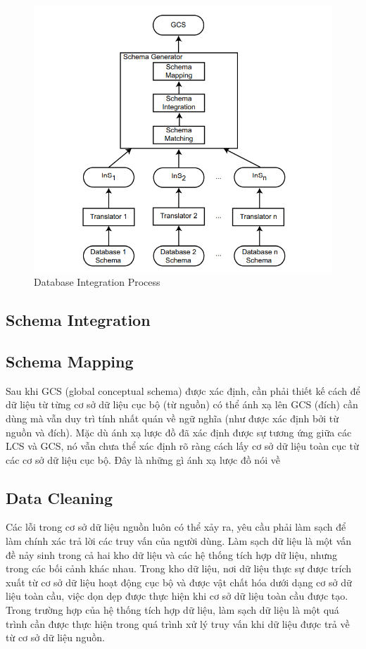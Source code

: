 \documentclass[a4paper]{article}
\begin{document}
\begin{figure}
    \centering
    \includegraphics[]{image/chap4/DBIntegrationProc.PNG}
    \caption{Database Integration Process}
\end{figure}



\subsection{Schema Integration}
\subsection{Schema Mapping}
Sau khi GCS (global conceptual schema) được xác định, cần phải thiết kế cách để dữ liệu từ từng cơ sở dữ liệu cục bộ (từ nguồn) có thể ánh xạ lên GCS (đích) cần dùng mà vẫn duy trì tính nhất quán về ngữ nghĩa (như được xác định bởi từ nguồn và đích). Mặc dù ánh xạ lược đồ đã xác định được sự tương ứng giữa các LCS và GCS, nó vẫn chưa thể xác định rõ ràng cách lấy cơ sở dữ liệu toàn cục từ các cơ sở dữ liệu cục bộ. Đây là những gì ánh xạ lược đồ nói về

\subsection{Data Cleaning}
Các lỗi trong cơ sở dữ liệu nguồn luôn có thể xảy ra, yêu cầu phải làm sạch để làm chính xác
trả lời các truy vấn của người dùng. Làm sạch dữ liệu là một vấn đề nảy sinh trong cả hai kho dữ liệu
và các hệ thống tích hợp dữ liệu, nhưng trong các bối cảnh khác nhau. Trong kho dữ liệu, nơi
dữ liệu thực sự được trích xuất từ cơ sở dữ liệu hoạt động cục bộ và được vật chất hóa dưới dạng
cơ sở dữ liệu toàn cầu, việc dọn dẹp được thực hiện khi cơ sở dữ liệu toàn cầu được tạo. Trong trường hợp
của hệ thống tích hợp dữ liệu, làm sạch dữ liệu là một quá trình cần được thực hiện
trong quá trình xử lý truy vấn khi dữ liệu được trả về từ cơ sở dữ liệu nguồn.
\end{document}
